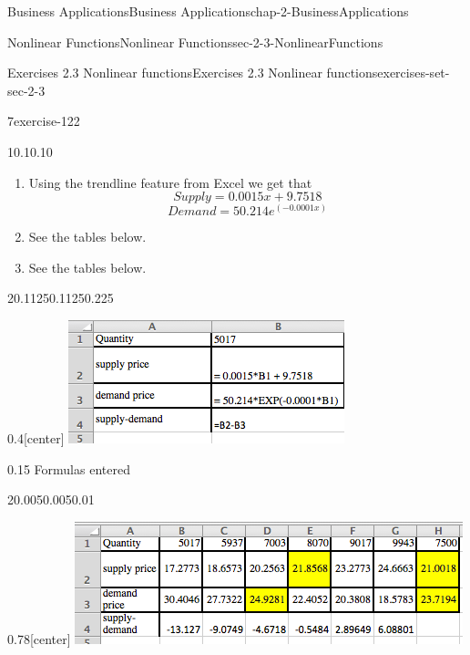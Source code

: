 \documentclass[oneside,10pt,]{book}
\numberwithin{equation}{section}
\begin{document}
\begin{chapterptx}{Business Applications}{}{Business Applications}{}{}{chap-2-BusinessApplications}
\begin{sectionptx}{Nonlinear Functions}{}{Nonlinear Functions}{}{}{sec-2-3-NonlinearFunctions}
\begin{exercises-subsection-numberless}{Exercises 2.3 Nonlinear functions}{}{Exercises 2.3 Nonlinear functions}{}{}{exercises-set-sec-2-3}
\begin{exercisegroup}
\begin{divisionexerciseeg}{7}{}{}{exercise-122}
\begin{sidebyside}{1}{0.1}{0.1}{0}
\end{sidebyside}%
\leavevmode%
\begin{enumerate}[label=(\alph*)]
\item\hypertarget{li-233}{}\hypertarget{p-831}{}%
Using the trendline feature from Excel we get that%
%
\begin{equation*}
Supply= 0.0015x + 9.7518 
\end{equation*}
%
\begin{equation*}
Demand = 50.214e^{(-0.0001x)}
\end{equation*}
\item\hypertarget{li-234}{}\hypertarget{p-832}{}%
See the tables below.%
\item\hypertarget{li-235}{}\hypertarget{p-833}{}%
See the tables below.%
\end{enumerate}
\begin{sidebyside}{2}{0.1125}{0.1125}{0.225}%
\begin{sbspanel}{0.4}[center]%
\includegraphics[width=1\linewidth]{images/sec2-3-sol7b.png}
\end{sbspanel}%
\begin{sbspanel}{0.15}%
\hypertarget{p-834}{}%
Formulas entered%
\end{sbspanel}%
\end{sidebyside}%
\begin{sidebyside}{2}{0.005}{0.005}{0.01}%
\begin{sbspanel}{0.78}[center]%
\includegraphics[width=1\linewidth]{images/sec2-3-sol7c.png}
\end{sbspanel}%

\end{sidebyside}
\end{divisionexerciseeg}
\end{exercisegroup}
\end{exercises-subsection-numberless}
\end{sectionptx}
\end{chapterptx}
\end{document}
